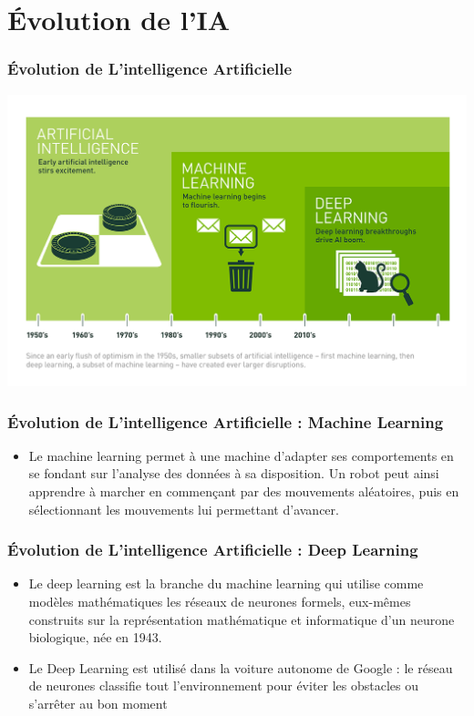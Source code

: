 \documentclass{beamer}
\begin{document}
	\section{Évolution de l'IA}
	\begin{frame}
	\frametitle{Évolution de L'intelligence  Artificielle}
	
	\centerline{\includegraphics{evolution.png}}
	
	\end{frame}
	
	\begin{frame}
	\frametitle{Évolution de L'intelligence  Artificielle : Machine Learning}
	\begin{itemize}
		\item Le machine learning permet à une machine d’adapter ses comportements en se fondant sur l’analyse des données à sa disposition. Un robot peut ainsi apprendre à marcher en commençant par des mouvements aléatoires, puis en sélectionnant les mouvements lui permettant d’avancer.
	\end{itemize}
	\end{frame}
	
	\begin{frame}
	\frametitle{Évolution de L'intelligence  Artificielle : Deep Learning}
	\begin{itemize}
		\itemsep1em
		\item Le deep learning est la branche du machine learning qui utilise comme modèles mathématiques les réseaux de neurones formels, eux-mêmes construits sur la représentation mathématique et informatique d’un neurone biologique, née en 1943.
		\item  Le Deep Learning est utilisé dans la voiture autonome  de Google : le réseau de  neurones 	classifie tout l’environnement pour éviter les obstacles ou s’arrêter au bon moment 
	\end{itemize}
	\end{frame}
	
\end{document}
